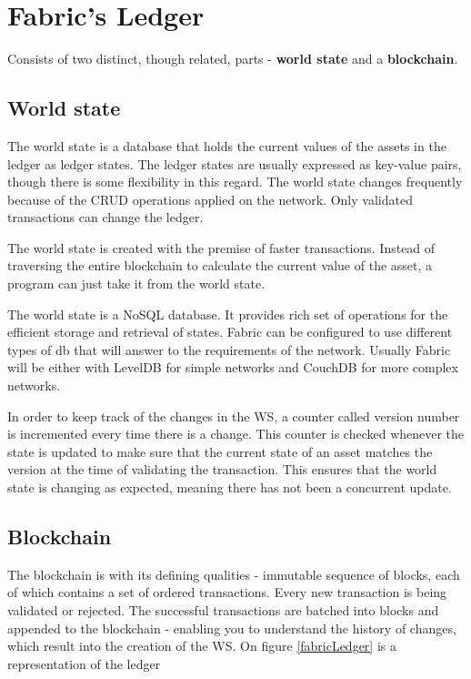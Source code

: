 \documentclass[a4paper,11pt]{report}
\begin{document}
\section{Fabric's Ledger}
\label{fLedger}
	Consists of two distinct, though related, parts - \textbf{world state} and  a \textbf{blockchain}.
	
\subsection{World state}
\label{ws}
The world state is a database that holds the current values of the assets in the ledger as ledger states. The ledger states are usually expressed as key-value pairs, though there is some flexibility in this regard. The world state changes frequently because of the CRUD operations applied on the network. Only validated transactions can change the ledger.

The world state is created with the premise of faster transactions. Instead of traversing the entire blockchain to calculate the current value of the asset, a program can just take it from the world state.

The world state is a NoSQL database. It provides rich set of operations for the efficient storage and retrieval of states. Fabric can be configured to use different types of db that will answer to the requirements of the network. Usually Fabric will be either with LevelDB for simple networks and CouchDB for more complex networks.

In order to keep track of the changes in the WS, a counter called version number is incremented every time there is a change. This counter is checked whenever the state is updated to make sure that the current state of an asset matches the version at the time of validating the transaction. This ensures that the world state is changing as expected, meaning there has not been a concurrent update. \cite{fabledger}

\subsection{Blockchain}

The blockchain is with its defining qualities - immutable sequence of blocks, each of which contains a set of ordered transactions. Every new transaction is being validated or rejected. The successful transactions are batched into blocks and appended to the blockchain - enabling you to understand the history of changes, which result into the creation of the WS. On figure \ref{fabricLedger} is a representation of the ledger
\end{document}

